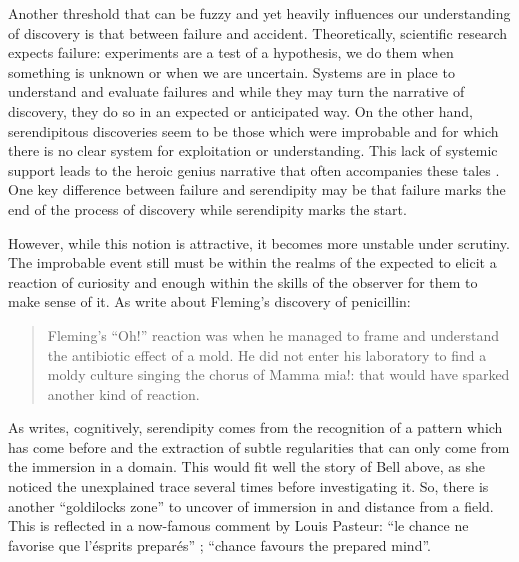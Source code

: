 \documentclass[authordate, empirical]{jote-new-article}
\begin{document}
Another threshold that can be fuzzy and yet heavily influences our understanding of discovery is that between failure and accident. Theoretically, scientific research expects failure: experiments are a test of a hypothesis, we do them when something is unknown or when we are uncertain. Systems are in place to understand and evaluate failures and while they may turn the narrative of discovery, they do so in an expected or anticipated way. On the other hand, serendipitous discoveries seem to be those which were improbable and for which there is no clear system for exploitation or understanding. This lack of systemic support leads to the heroic genius narrative that often accompanies these tales \parencites{Copeland2018}. One key difference between failure and serendipity may be that failure marks the end of the process of discovery while serendipity marks the start.



However, while this notion is attractive, it becomes more unstable under scrutiny. The improbable event still must be within the realms of the expected to elicit a reaction of curiosity and enough within the skills of the observer for them to make sense of it. As \textcites[][p. 5]{Arfini2018} write about Fleming's discovery of penicillin:



\begin{quotation}
  Fleming's “Oh!” reaction was when he managed to frame and understand the antibiotic effect of a mold. He did not enter his laboratory to find a moldy culture singing the chorus of Mamma mia!: that would have sparked another kind of reaction.
\end{quotation}


As \textcites{Boden2004} writes, cognitively, serendipity comes from the recognition of a pattern which has come before and the extraction of subtle regularities that can only come from the immersion in a domain. This would fit well the story of Bell above, as she noticed the unexplained trace several times before investigating it. So, there is another “goldilocks zone” to uncover of immersion in and distance from a field. This is reflected in a now-famous comment by Louis Pasteur: “le chance ne favorise que l'ésprits preparés” \parencites{Pasteur1854}; “chance favours the prepared mind”.
\end{document}
